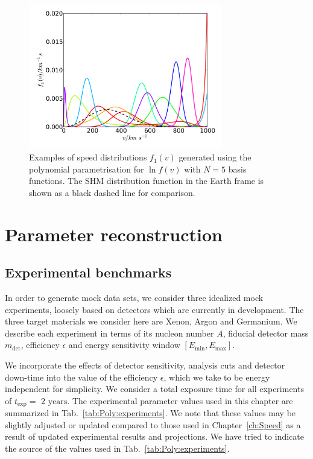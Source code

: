 \begin{figure}[h]
\centering
  \includegraphics[width=0.75\textwidth]{Poly/Poly.pdf}
  \caption[Examples of $\ln f(v)$ polynomial distributions]{Examples of speed distributions $f_1(v)$ generated using the polynomial parametrisation for $\ln f(v)$ with $N=5$ basis functions. The SHM distribution function in the Earth frame is shown as a black dashed line for comparison.}
  \label{fig:Poly:examples}
\end{figure}

\section{Parameter reconstruction}

\subsection{Experimental benchmarks}
\label{sec:Poly:experiments}
In order to generate mock data sets, we consider three idealized mock experiments, loosely based on detectors which are currently in development. The three target materials we consider here are Xenon, Argon and Germanium. We describe each experiment in terms of its nucleon number $A$, fiducial detector mass $m_\textrm{det}$, efficiency $\epsilon$ and energy sensitivity window $\left[E_\textrm{min}, E_\textrm{max}\right]$. 

We incorporate the effects of detector sensitivity, analysis cuts and detector down-time into the value of the efficiency $\epsilon$, which we take to be energy independent for simplicity. We consider a total exposure time for all experiments of $t_\textrm{exp} = \textrm{ 2 years}$. The experimental parameter values used in this chapter are summarized in Tab.~\ref{tab:Poly:experiments}. We note that these values may be slightly adjusted or updated compared to those used in Chapter~\ref{ch:Speed} as a result of updated experimental results and projections. We have tried to indicate the source of the values used in Tab.~\ref{tab:Poly:experiments}.

